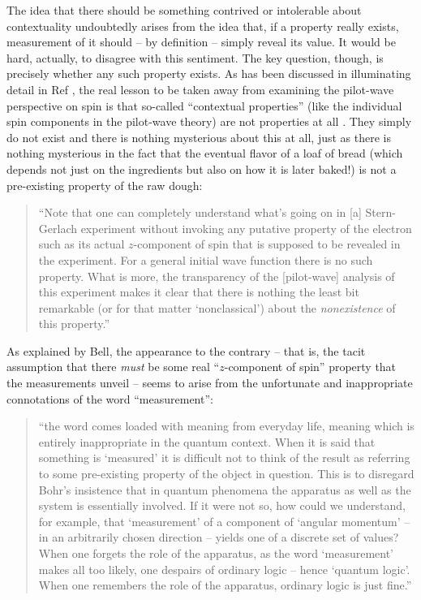 \documentclass[aps,prc,onecolumn,letterpaper,floatfix,12pt]{revtex4}
\begin{document}
The idea that there should be something contrived or intolerable about
contextuality undoubtedly arises from the idea that, if a property
really exists, measurement of it should -- by definition -- 
simply reveal its value.  It
would be hard, actually, to disagree with this sentiment.  The key
question, though, is precisely whether any such property exists.  As
has been discussed in illuminating detail in Ref \cite{nrao} ,
the real lesson to be taken away from examining the
pilot-wave perspective on spin is that so-called ``contextual
properties'' (like the individual spin components in the pilot-wave
theory) are not properties at all \cite{history}.  They simply do not exist and
there is nothing mysterious about this at all, just as there is
nothing mysterious in the fact that the 
eventual flavor of a loaf of bread (which depends not just on
the ingredients but also on how it is later baked!) is not a pre-existing
property of the raw dough:
\begin{quote}
``Note that one can completely understand what's going on in
[a] Stern-Gerlach experiment without invoking any putative property of
the electron such as its actual $z$-component of spin that is supposed
to be revealed in the experiment.  For a general initial wave function
there is no such property.  What is more, the transparency of the [pilot-wave]
analysis of this experiment makes it clear that there is nothing the
least bit remarkable (or for that matter `nonclassical') about the
\emph{nonexistence} of this property.''  \cite{qeop}
\end{quote}
As explained by Bell, the appearance to the contrary -- that is, the
tacit assumption that there \emph{must} be some real ``$z$-component
of spin'' property that the measurements unveil -- seems to arise from
the unfortunate and inappropriate connotations of the word
``measurement'':  
\begin{quote}
``the word comes loaded with meaning from everyday life, meaning which
is entirely inappropriate in the quantum context.  When it is said
that something is `measured' it is difficult not to think of the
result as referring to some pre-existing property of the object in
question.  This is to disregard Bohr's insistence that in quantum
phenomena the apparatus as well as the system is essentially
involved.  If it were not so, how could we understand, for example,
that `measurement' of a component of `angular momentum' -- in an
arbitrarily chosen direction -- yields one of a discrete set of
values?  When one forgets the role of the apparatus, as the word
`measurement' makes all too likely, one despairs of ordinary logic --
hence `quantum logic'.  When one remembers the role of the apparatus,
ordinary logic is just fine.''  \cite{against}
\end{quote}
\end{document}
